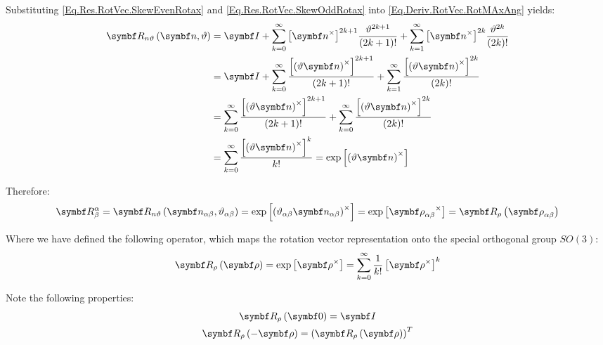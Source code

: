 Substituting \eqref{Eq.Res.RotVec.SkewEvenRotax} and \eqref{Eq.Res.RotVec.SkewOddRotax} into \eqref{Eq.Deriv.RotVec.RotMAxAng} yields:
\begin{equation*}
\begin{split}
\RotMAxAng{\mcol{\rotax}}{\rotang}
&= \IdM + \sum^{\infty}_{k=0} {\vskew{\mcol{\rotax}}}^{2k+1} {\frac{\rotang^{2k+1}}{(2k+1)!}} + \sum^{\infty}_{k=1} {\vskew{\mcol{\rotax}}}^{2k} {\frac{\rotang^{2k}}{(2k)!}} \\
&= \IdM + \sum^{\infty}_{k=0} {\frac{{\vskew{\rndp{\rotang\mcol{\rotax}}}}^{2k+1}}{(2k+1)!}} + \sum^{\infty}_{k=1} {\frac{ {\vskew{\rndp{\rotang\mcol{\rotax}}}}^{2k}}{(2k)!}} \\
&= \sum^{\infty}_{k=0} {\frac{{\vskew{\rndp{\rotang\mcol{\rotax}}}}^{2k+1}}{(2k+1)!}} + \sum^{\infty}_{k=0} {\frac{ {\vskew{\rndp{\rotang\mcol{\rotax}}}}^{2k}}{(2k)!}} \\
&= \sum^{\infty}_{k=0} {\frac{{\vskew{\rndp{\rotang\mcol{\rotax}}}}^{k}}{k!}} = \exp \vskew{\rndp{\rotang\mcol{\rotax}}}
\end{split}
\end{equation*}

Therefore:
\begin{equation} \label{Eq.Res.RotMat.RotVec.Operator}
	\RotM{\alpha}{\beta} = \RotMAxAng{\vrel{\rotax}{\alpha}{\beta}}{\rel{\rotang}{\alpha}{\beta}} = \exp \vskew{\rndp{\rel{\rotang}{\alpha}{\beta} \vrel{\rotax}{\alpha}{\beta}}} = \exp \vskew{\rotv{\alpha}{\beta}} = \RotMRotV{\rotv{\alpha}{\beta}}
\end{equation}

Where we have defined the following operator, which maps the rotation vector representation onto the special orthogonal group $SO(3)$:
\begin{equation} \label{Eq.Def.RotVec.Operator}
\RotMRotV{\mcol{\rotvecsymb}} = \exp \vskew{\mcol{\rotvecsymb}} = \sum^{\infty}_{k=0} \frac{1}{k!} \vskew{\mcol{\rotvecsymb}}^{k}
\end{equation}

Note the following properties:
\begin{gather*}
\RotMRotV{\mcol{0}} = \IdM \\
\RotMRotV{-\mcol{\rotvecsymb}} = \trp{\RotMRotV{\mcol{\rotvecsymb}}}
\end{gather*}

